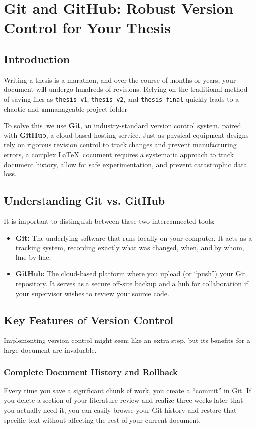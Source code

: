 \chapter{Git and GitHub: Robust Version Control for Your Thesis}\label{ch:github}
	\section{Introduction}\label{sec:GitIntroduction}
		Writing a thesis is a marathon, and over the course of months or years, your document will undergo hundreds of revisions. 
		Relying on the traditional method of saving files as \texttt{thesis\_v1}, \texttt{thesis\_v2}, and \texttt{thesis\_final} quickly leads to a chaotic and unmanageable project folder. 

		To solve this, we use \textbf{Git}, an industry-standard version control system, paired with \textbf{GitHub}, a cloud-based hosting service. 
		Just as physical equipment designs rely on rigorous revision control to track changes and prevent manufacturing errors, a complex \LaTeX\ document requires a systematic approach to track document history, allow for safe experimentation, and prevent catastrophic data loss.

	\section{Understanding Git vs. GitHub}
		It is important to distinguish between these two interconnected tools:
		\begin{itemize}
			\item \textbf{Git:} The underlying software that runs locally on your computer. 
				It acts as a tracking system, recording exactly what was changed, when, and by whom, line-by-line.
			\item \textbf{GitHub:} The cloud-based platform where you upload (or ``push'') your Git repository. 
				It serves as a secure off-site backup and a hub for collaboration if your supervisor wishes to review your source code.
		\end{itemize}

	\section{Key Features of Version Control}
		Implementing version control might seem like an extra step, but its benefits for a large document are invaluable.

		\subsection{Complete Document History and Rollback}
			Every time you save a significant chunk of work, you create a ``commit'' in Git. 
			If you delete a section of your literature review and realize three weeks later that you actually need it, you can easily browse your Git history and restore that specific text without affecting the rest of your current document.

